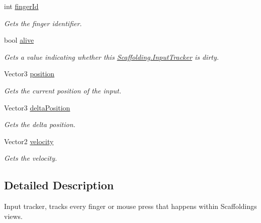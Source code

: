 \begin{DoxyCompactItemize}
\item 
int \hyperlink{class_scaffolding_1_1_input_tracker_a2ea83b7d3578473eaddc1360739b48e7}{finger\-Id}
\begin{DoxyCompactList}\small\item\em Gets the finger identifier. \end{DoxyCompactList}\item 
bool \hyperlink{class_scaffolding_1_1_input_tracker_ac490c7f5cc792230aa3ca2fd87fb43b4}{alive}
\begin{DoxyCompactList}\small\item\em Gets a value indicating whether this \hyperlink{class_scaffolding_1_1_input_tracker}{Scaffolding.\-Input\-Tracker} is dirty. \end{DoxyCompactList}\item 
Vector3 \hyperlink{class_scaffolding_1_1_input_tracker_ab29b6a8291f5f49035544a3c6e592be0}{position}
\begin{DoxyCompactList}\small\item\em Gets the current position of the input. \end{DoxyCompactList}\item 
Vector3 \hyperlink{class_scaffolding_1_1_input_tracker_a7f6ba8cef62bec4066f132a3d0d1f7c1}{delta\-Position}
\begin{DoxyCompactList}\small\item\em Gets the delta position. \end{DoxyCompactList}\item 
Vector2 \hyperlink{class_scaffolding_1_1_input_tracker_a1cca0ea0d1202267e88f7a88f511d2c5}{velocity}
\begin{DoxyCompactList}\small\item\em Gets the velocity. \end{DoxyCompactList}\end{DoxyCompactItemize}


\subsection{Detailed Description}
Input tracker, tracks every finger or mouse press that happens within Scaffoldings views. 



